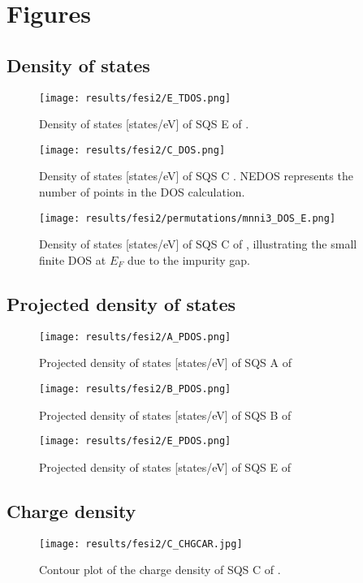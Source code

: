 \chapter{Figures}
\label{appendix:equi}

\section{Density of states}

\begin{figure}[H]
	\centering
	\texttt{[image: results/fesi2/E\_TDOS.png]}
	\caption{Density of states [states/eV] of SQS E of .}
\end{figure}

\begin{figure}[H]
	\centering
	\texttt{[image: results/fesi2/C\_DOS.png]}
	\caption{Density of states [states/eV] of SQS C . NEDOS represents the number of points in the DOS calculation.}
\end{figure}

\begin{figure}[H]
\texttt{[image: results/fesi2/permutations/mnni3\_DOS\_E.png]}
\caption{Density of states [states/eV] of SQS C of , illustrating the small finite DOS at $E_F$ due to the impurity gap.}
\end{figure}

\section{Projected density of states}

\begin{figure}[H]
\texttt{[image: results/fesi2/A\_PDOS.png]}
\caption{Projected density of states [states/eV] of SQS A of }
\end{figure}

\begin{figure}[H]
\texttt{[image: results/fesi2/B\_PDOS.png]}
\caption{Projected density of states [states/eV] of SQS B of }
\end{figure}

\begin{figure}[H]
\texttt{[image: results/fesi2/E\_PDOS.png]}
\caption{Projected density of states [states/eV] of SQS E of }
\end{figure}

\section{Charge density}

\begin{figure}[H]
\texttt{[image: results/fesi2/C\_CHGCAR.jpg]}
\caption{Contour plot of the charge density of SQS C of .}
\end{figure}


